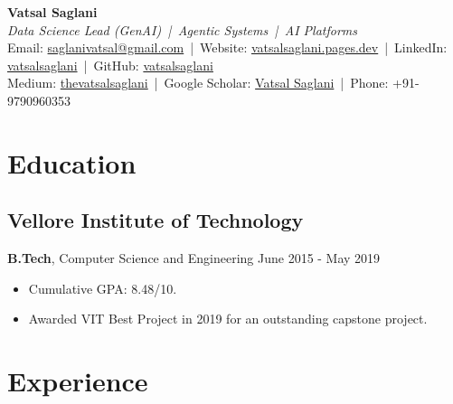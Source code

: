 \documentclass[11pt,a4paper]{article}
\newcommand{\sectionline}{
  \noindent\makebox[\linewidth]{\rule{\paperwidth}{0.4pt}}
}
\begin{document}
\begin{center}
    {\Huge\bfseries Vatsal Saglani}\\[0.35em]
    \textit{Data Science Lead (GenAI) \,|\, Agentic Systems \,|\, AI Platforms}\\[0.45em]

    \small
    Email: \href{mailto:saglanivatsal@gmail.com}{saglanivatsal@gmail.com} \,|\, 
    Website: \href{https://vatsalsaglani.pages.dev}{vatsalsaglani.pages.dev} \,|\, 
    LinkedIn: \href{https://linkedin.com/in/vatsalsaglani}{vatsalsaglani} \,|\, 
    GitHub: \href{https://github.com/vatsalsaglani/}{vatsalsaglani}\\
    Medium: \href{https://thevatsalsaglani.medium.com/}{thevatsalsaglani} \,|\, 
    Google Scholar: \href{https://scholar.google.com/citations?user=3RB_jh0AAAAJ&hl=en}{Vatsal Saglani} \,|\, 
    Phone: +91-9790960353
\end{center}
\sectionline

\section*{Education}
\subsection*{Vellore Institute of Technology}
\textbf{B.Tech}, Computer Science and Engineering \hfill June 2015 - May 2019\\
\begin{itemize}
    \item Cumulative GPA: 8.48/10.
    \item Awarded VIT Best Project in 2019 for an outstanding capstone project.
\end{itemize}


\section*{Experience}
\end{document}
